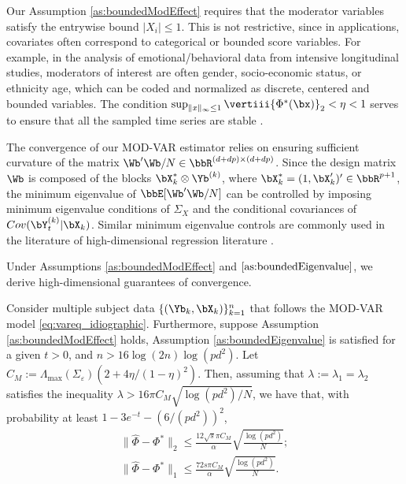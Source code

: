 Our Assumption \ref{as:boundedModEffect} requires that the moderator variables satisfy the entrywise bound $|X_i|\leq 1$. This is not restrictive, since in applications, covariates often correspond to categorical or bounded score variables. For example, in the analysis of emotional/behavioral data from intensive longitudinal studies, moderators of interest are often gender, socio-economic status, or ethnicity age, which can be coded and normalized as discrete, centered and bounded variables. The condition $\sup_{\|x\|_\infty \leq 1} \vertiii{\Phi^*(\bx)}_2 < \eta < 1 $ serves to ensure that all the sampled time series are stable \citep{basu2015regularized}.

The convergence of our MOD-VAR estimator relies on ensuring sufficient curvature of the matrix $\Wb'\Wb/N\in\bbR^{(d+dp)\times (d+dp)}$. Since the design matrix $\Wb$ is composed of the blocks  $\bX_k^*\otimes \Yb^{(k)}$, where $\bX_k^* = (1,\bX_k')'\in\bbR^{p+1}$, the minimum eigenvalue of $\bbE[\Wb'\Wb/N]$ can be controlled by imposing minimum eigenvalue conditions of $\Sigma_X$ and the conditional covariances of $Cov(\bY_t^{(k)}| \bX_k)$. Similar minimum eigenvalue controls are commonly used in the literature of high-dimensional regression literature \citep{loh2011high,basu2015regularized,wainwright2019high}. 

Under Assumptions \ref{as:boundedModEffect} and $\ref{as:boundedEigenvalue}$, we derive high-dimensional guarantees of convergence.

\begin{thm}\label{thm:modvar_normconsistency}
    Consider multiple subject data $\{(\Yb_k, \bX_k)\}_{k=1}^n$ that follows the MOD-VAR model \eqref{eq:vareq_idiographic}. Furthermore, suppose Assumption \ref{as:boundedModEffect} holds, Assumption \ref{as:boundedEigenvalue} is satisfied for a given $t> 0$, and $n > 16\log(2n)\log(pd^2)$. Let $C_M := \Lambda_{\max}(\Sigma_\varepsilon)(2 + 4\eta / (1 - \eta)^2 ).$
    Then, assuming that $\lambda:= \lambda_1 = \lambda_2$ satisfies the inequality $\lambda > 16 \pi C_M  \sqrt{{\log(pd^2)}/{N}}$, we have that, with probability at least $1 - 3e^{-t} - (6/(pd^2))^2$,
    \begin{align}
        \|\hat\Phi - \Phi^* \|_2  \leq \frac{12\sqrt{s} \pi C_M}{\alpha}  \sqrt{\frac{\log(pd^2)}{N}};  \label{eq:consistency_l2}\\
        \| \hat\Phi - \Phi^*\|_1 \leq  \frac{72 s \pi C_M}{\alpha}  \sqrt{\frac{\log(pd^2)}{N}}.\label{eq:consistency_l1}
    \end{align}
\end{thm}

